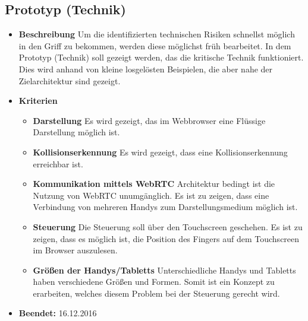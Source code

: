 \subsection{Prototyp (Technik)}
\begin{itemize}
	\item \textbf{Beschreibung}\newline
	Um die identifizierten technischen Risiken schnellst möglich in den Griff zu bekommen, werden diese möglichst früh bearbeitet. In dem Prototyp (Technik) soll gezeigt werden, das die kritische Technik funktioniert. Dies wird anhand von kleine losgelösten Beispielen, die aber nahe der Zielarchitektur sind gezeigt.
	\item \textbf{Kriterien}
	\begin{itemize}
		\item \textbf{Darstellung} \newline
		Es wird gezeigt, das im Webbrowser eine Flüssige Darstellung möglich ist.
		\item \textbf{Kollisionserkennung} \newline
		Es wird gezeigt, dass eine Kollisionserkennung erreichbar ist.
		\item \textbf{Kommunikation mittels WebRTC} \newline
		Architektur bedingt ist die Nutzung von WebRTC unumgänglich. Es ist zu zeigen, dass eine Verbindung von mehreren Handys zum Darstellungsmedium möglich ist.
		\item \textbf{Steuerung} \newline
		Die Steuerung soll über den Touchscreen geschehen. Es ist zu zeigen, dass es möglich ist, die Position des Fingers auf dem Touchscreen im Browser auszulesen. 
		\item \textbf{Größen der Handys/Tabletts} \newline
		Unterschiedliche Handys und Tabletts haben verschiedene Größen und Formen. Somit ist ein Konzept zu erarbeiten, welches diesem Problem bei der Steuerung gerecht wird.
	\end{itemize}
	\item \textbf{Beendet:} 16.12.2016
\end{itemize}

